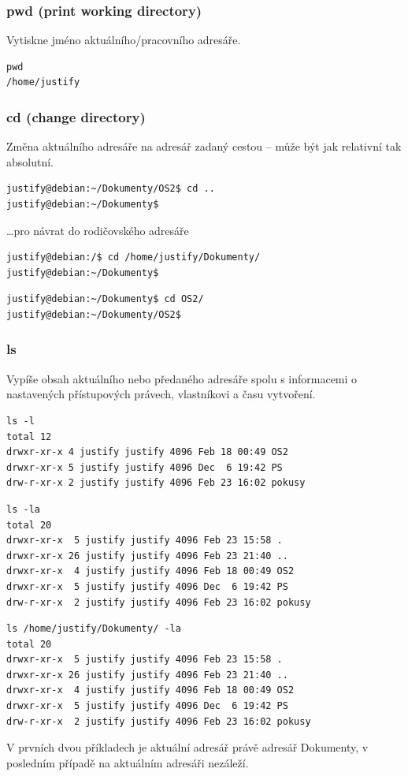 \documentclass{article}
\begin{document}
\subsubsection{pwd (print working directory)}
Vytiskne jméno aktuálního/pracovního adresáře.
\begin{verbatim}
pwd
/home/justify
\end{verbatim}

\subsubsection{cd (change directory)}
Změna aktuálního adresáře na adresář zadaný cestou -- může být jak relativní tak absolutní.
\begin{verbatim}
justify@debian:~/Dokumenty/OS2$ cd ..
justify@debian:~/Dokumenty$ 
\end{verbatim}
\dots pro návrat do rodičovského adresáře

\begin{verbatim}
justify@debian:/$ cd /home/justify/Dokumenty/
justify@debian:~/Dokumenty$
\end{verbatim}

\begin{verbatim}
justify@debian:~/Dokumenty$ cd OS2/
justify@debian:~/Dokumenty/OS2$

\end{verbatim}

\subsubsection{ls}
Vypíše obsah aktuálního nebo předaného adresáře spolu s informacemi o nastavených přístupových právech, vlastníkovi a času vytvoření.

\begin{verbatim}
ls -l
total 12
drwxr-xr-x 4 justify justify 4096 Feb 18 00:49 OS2
drwxr-xr-x 5 justify justify 4096 Dec  6 19:42 PS
drw-r-xr-x 2 justify justify 4096 Feb 23 16:02 pokusy
\end{verbatim}

\begin{verbatim}
ls -la
total 20
drwxr-xr-x  5 justify justify 4096 Feb 23 15:58 .
drwxr-xr-x 26 justify justify 4096 Feb 23 21:40 ..
drwxr-xr-x  4 justify justify 4096 Feb 18 00:49 OS2
drwxr-xr-x  5 justify justify 4096 Dec  6 19:42 PS
drw-r-xr-x  2 justify justify 4096 Feb 23 16:02 pokusy
\end{verbatim}

\begin{verbatim}
ls /home/justify/Dokumenty/ -la
total 20
drwxr-xr-x  5 justify justify 4096 Feb 23 15:58 .
drwxr-xr-x 26 justify justify 4096 Feb 23 21:40 ..
drwxr-xr-x  4 justify justify 4096 Feb 18 00:49 OS2
drwxr-xr-x  5 justify justify 4096 Dec  6 19:42 PS
drw-r-xr-x  2 justify justify 4096 Feb 23 16:02 pokusy
\end{verbatim}
V prvních dvou příkladech je aktuální adresář právě adresář Dokumenty, v posledním případě na aktuálním adresáři nezáleží.
\end{document}
